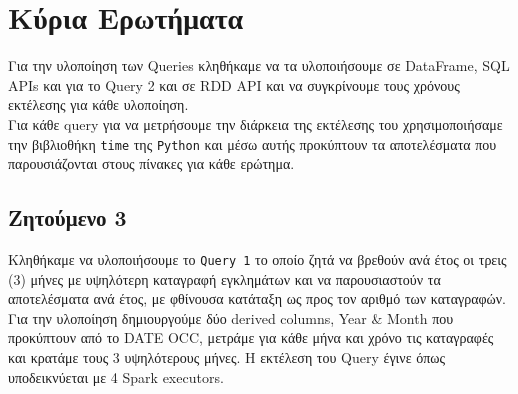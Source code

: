 \documentclass{article}
\begin{document}
\section{Κύρια Ερωτήματα}
\label{sec:main_z}
Για την υλοποίηση των  Queries  κληθήκαμε να τα υλοποιήσουμε σε  DataFrame, SQL APIs  και για το  Query 2  και σε  RDD API  και να συγκρίνουμε τους χρόνους εκτέλεσης για κάθε υλοποίηση.\\
Για κάθε  query  για να μετρήσουμε την διάρκεια της εκτέλεσης του χρησιμοποιήσαμε την βιβλιοθήκη  \texttt{time}  της  \texttt{Python}  και μέσω αυτής προκύπτουν τα αποτελέσματα που παρουσιάζονται στους πίνακες για κάθε ερώτημα. 



\subsection{Ζητούμενο 3}
\label{subsec:Z3}


Κληθήκαμε να υλοποιήσουμε το  \texttt{Query 1}  το οποίο ζητά να βρεθούν ανά έτος οι τρεις (3) μήνες με υψηλότερη καταγραφή εγκλημάτων και να παρουσιαστούν τα αποτελέσματα ανά έτος, με φθίνουσα κατάταξη ως προς τον αριθμό των καταγραφών. Για την υλοποίηση δημιουργούμε δύο  derived columns, Year \& Month  που προκύπτουν από το  DATE OCC,  μετράμε για κάθε μήνα και χρόνο τις καταγραφές και κρατάμε τους 3 υψηλότερους μήνες. Η εκτέλεση του  Query  έγινε όπως υποδεικνύεται με 4 Spark executors.\\
\\
\end{document}
